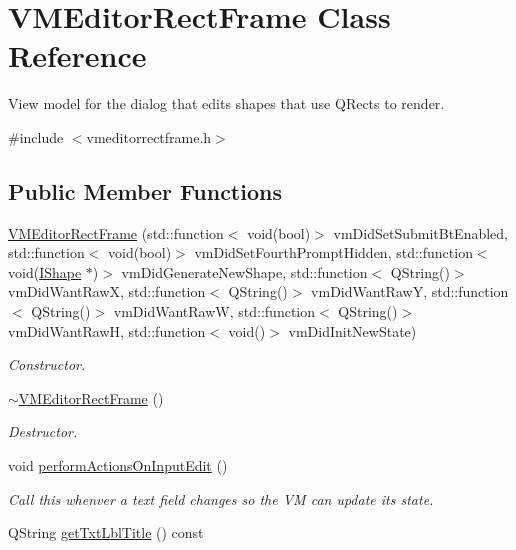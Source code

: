 \hypertarget{class_v_m_editor_rect_frame}{}\section{V\+M\+Editor\+Rect\+Frame Class Reference}
\label{class_v_m_editor_rect_frame}


View model for the dialog that edits shapes that use Q\+Rects to render.  




{\ttfamily \#include $<$vmeditorrectframe.\+h$>$}

\subsection*{Public Member Functions}
\begin{DoxyCompactItemize}
\item 
\mbox{\hyperlink{class_v_m_editor_rect_frame_a72a9481e229b4ac80e62b1e5cd17eb1d}{V\+M\+Editor\+Rect\+Frame}} (std\+::function$<$ void(bool)$>$ vm\+Did\+Set\+Submit\+Bt\+Enabled, std\+::function$<$ void(bool)$>$ vm\+Did\+Set\+Fourth\+Prompt\+Hidden, std\+::function$<$ void(\mbox{\hyperlink{class_i_shape}{I\+Shape}} $\ast$)$>$ vm\+Did\+Generate\+New\+Shape, std\+::function$<$ Q\+String()$>$ vm\+Did\+Want\+RawX, std\+::function$<$ Q\+String()$>$ vm\+Did\+Want\+RawY, std\+::function$<$ Q\+String()$>$ vm\+Did\+Want\+RawW, std\+::function$<$ Q\+String()$>$ vm\+Did\+Want\+RawH, std\+::function$<$ void()$>$ vm\+Did\+Init\+New\+State)
\begin{DoxyCompactList}\small\item\em Constructor. \end{DoxyCompactList}\item 
\mbox{\hyperlink{class_v_m_editor_rect_frame_afc272dc994d9f1848ea4a1d444d12065}{$\sim$\+V\+M\+Editor\+Rect\+Frame}} ()
\begin{DoxyCompactList}\small\item\em Destructor. \end{DoxyCompactList}\item 
void \mbox{\hyperlink{class_v_m_editor_rect_frame_ade820d17c7487ae91721d49121d2f264}{perform\+Actions\+On\+Input\+Edit}} ()
\begin{DoxyCompactList}\small\item\em Call this whenver a text field changes so the VM can update its state. \end{DoxyCompactList}\item 
Q\+String \mbox{\hyperlink{class_v_m_editor_rect_frame_a6a264071219d7ecd70bd488c28ccb186}{get\+Txt\+Lbl\+Title}} () const

\end{DoxyCompactItemize}
